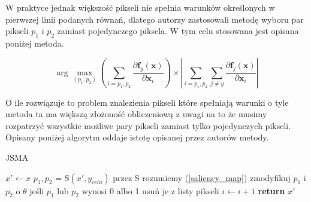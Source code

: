 \documentclass{article}
\begin{document}

W praktyce jednak większość pikseli nie spełnia warunków określonych w pierwszej linii podanych równań,
dlatego autorzy zastosowali metodę wyboru par pikseli $p_1$ i $p_2$ zamiast pojedynczego piksela.
W tym celu stosowana jest opisana poniżej metoda.

\begin{equation} \label{saliency_map}
\arg \max _ { \left( p _ { 1 } , p _ { 2 } \right) } \left( \sum _ { i = p _ { 1 } , p _ { 2 } } \frac { \partial \mathbf { f } _ { y } ( \mathbf { x } ) } { \partial \mathbf { x } _ { i } } \right) \times \left| \sum _ { i = p _ { 1 } , p _ { 2 } } \sum _ { j \neq y } \frac { \partial \mathbf { f } _ { j } ( \mathbf { x } ) } { \partial \mathbf { x } _ { i } } \right|
\end{equation}

O ile rozwiązuje to problem znalezienia pikseli które spełniają warunki o tyle metoda ta ma większą złożoność obliczeniową
z uwagi na to że musimy rozpatrzyć wszystkie możliwe pary pikseli zamiast tylko pojedynczych pikseli.
Opisany poniżej algorytm oddaje istotę opisanej przez autorów metody.

\begin{algorithm}
\caption{JSMA}\label{JSMA}
\begin{algorithmic}[1]
\State $x' \gets x$
    \State $p_1, p_2$ = S$(x',y_{celu})$ \Comment przez S rozumiemy (\ref{saliency_map})
    \State zmodyfikuj $p_1$ i $p_2$ o $\theta$
    \State jeśli $p_1$ lub $p_2$ wynosi 0 albo 1 usuń je z listy pikseli
    \State $i \gets i+1$
\EndWhile
\State \textbf{return} $x'$
\end{algorithmic}
\end{algorithm}
\end{document}

